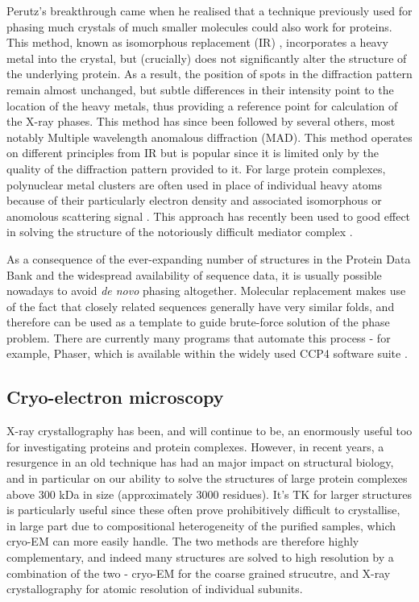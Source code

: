 \documentclass[a4paper,11pt,twoside,openright]{scrbook}
\let\cite\supercite
\begin{document}
Perutz's breakthrough came when he realised that a technique previously used for phasing much crystals of much smaller molecules could also work for proteins. This method, known as isomorphous replacement (IR)  \cite{Robertson1936}, incorporates a heavy metal into the crystal, but (crucially) does not significantly alter the structure of the underlying protein. As a result, the position of spots in the diffraction pattern remain almost unchanged, but subtle differences in their intensity point to the location of the heavy metals, thus providing a reference point for calculation of the X-ray phases. This method has since been followed by several others, most notably Multiple wavelength anomalous diffraction (MAD). This method operates on different principles from IR but is popular since it is limited only by the quality of the diffraction pattern provided to it. For large protein complexes, polynuclear metal clusters are often used in place of individual heavy atoms because of their particularly electron density and associated isomorphous or anomolous scattering signal \cite{Dauter2005}. This approach has recently been used to good effect in solving the structure of the notoriously difficult mediator complex \cite{Nozawa2017}.

As a consequence of the ever-expanding number of structures in the Protein Data Bank and the widespread availability of sequence data, it is usually possible nowadays to avoid \textit{de novo} phasing altogether. Molecular replacement makes use of the fact that closely related sequences generally have very similar folds, and therefore can be used as a template to guide brute-force solution of the phase problem. There are currently many programs that automate this process - for example, Phaser, which is available within the widely used CCP4 software suite \cite{McCoy2007, Winn2011a}.


\subsection{Cryo-electron microscopy}

X-ray crystallography has been, and will continue to be, an enormously useful too for investigating proteins and protein complexes. However, in recent years, a resurgence in an old technique has had an major impact on structural biology, and in particular on our ability to solve the structures of large protein complexes above 300 kDa in size (approximately 3000 residues). It's TK for larger structures is particularly useful since these often prove prohibitively difficult to crystallise, in large part due to compositional heterogeneity of the purified samples, which cryo-EM can more easily handle. The two methods are therefore highly complementary, and indeed many structures are solved to high resolution by a combination of the two - cryo-EM for the coarse grained strucutre, and X-ray crystallography for atomic resolution of individual subunits.
\end{document}
